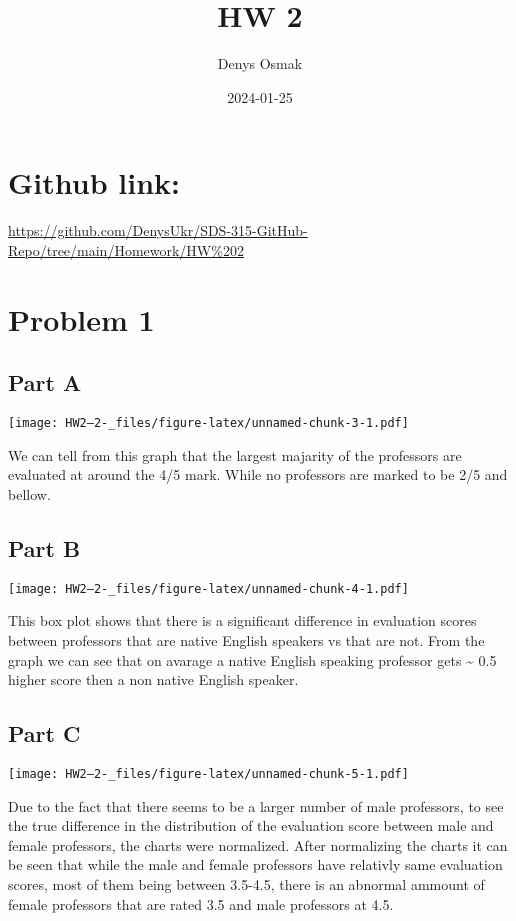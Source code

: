 \documentclass[
]{article}
\title{HW 2}
\author{Denys Osmak}
\date{2024-01-25}
\begin{document}
\maketitle

\hypertarget{github-link}{%
\section{Github link:}\label{github-link}}

\url{https://github.com/DenysUkr/SDS-315-GitHub-Repo/tree/main/Homework/HW\%202}

\hypertarget{problem-1}{%
\section{Problem 1}\label{problem-1}}

\hypertarget{part-a}{%
\subsection{Part A}\label{part-a}}

\texttt{[image: HW2--2-\_files/figure-latex/unnamed-chunk-3-1.pdf]}

We can tell from this graph that the largest majarity of the professors
are evaluated at around the 4/5 mark. While no professors are marked to
be 2/5 and bellow.

\hypertarget{part-b}{%
\subsection{Part B}\label{part-b}}

\texttt{[image: HW2--2-\_files/figure-latex/unnamed-chunk-4-1.pdf]}

This box plot shows that there is a significant difference in evaluation
scores between professors that are native English speakers vs that are
not. From the graph we can see that on avarage a native English speaking
professor gets \textasciitilde{} 0.5 higher score then a non native
English speaker.

\hypertarget{part-c}{%
\subsection{Part C}\label{part-c}}

\texttt{[image: HW2--2-\_files/figure-latex/unnamed-chunk-5-1.pdf]}

Due to the fact that there seems to be a larger number of male
professors, to see the true difference in the distribution of the
evaluation score between male and female professors, the charts were
normalized. After normalizing the charts it can be seen that while the
male and female professors have relativly same evaluation scores, most
of them being between 3.5-4.5, there is an abnormal ammount of female
professors that are rated 3.5 and male professors at 4.5.
\end{document}

